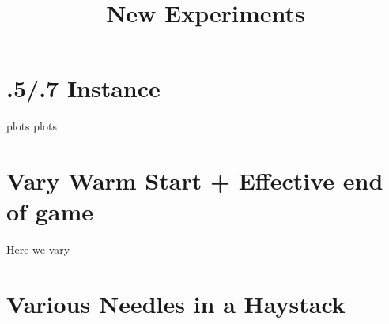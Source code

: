 \documentclass[11pt,letterpaper]{article}
\begin{document}
 

\title{New Experiments}
\maketitle


\section*{.5/.7 Instance}

plots plots

\section*{Vary Warm Start + Effective end of game}

Here we vary


\section*{Various Needles in a Haystack}


\end{document}
